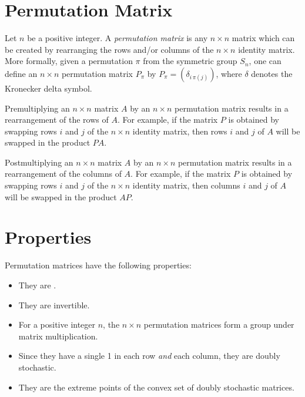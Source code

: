 \documentclass[12pt]{article}
\begin{document}

\section{Permutation Matrix}

Let $n$ be a positive integer.  A \emph{permutation matrix} is any $n\times n$ matrix which can be created by rearranging the rows and/or columns of the $n\times n$ identity matrix.  More formally, given a permutation $\pi$ from the symmetric group $S_n$, one can define an $n\times n$ permutation matrix $P_{\pi}$ by $P_{\pi}=(\delta_{i\, \pi(j)})$, where $\delta$ denotes the Kronecker delta symbol.  

Premultiplying an $n\times n$ matrix $A$ by an $n\times n$ permutation matrix results in a rearrangement of the rows of $A$.  For example, if the matrix $P$ is obtained by swapping rows $i$ and $j$ of the $n \times n$ identity matrix, then rows $i$ and $j$ of $A$ will be swapped in the product $PA$.

Postmultiplying an $n\times n$ matrix $A$ by an $n\times n$ permutation matrix results in a rearrangement of the columns of $A$.  For example, if the matrix $P$ is obtained by swapping rows $i$ and $j$ of the $n \times n$ identity matrix, then columns $i$ and $j$ of $A$ will be swapped in the product $AP$.

\section{Properties}

Permutation matrices have the following properties:

\begin{itemize}
\item They are .
\item They are invertible.
\item For a  positive integer $n$, the $n \times n$ permutation matrices form a group under matrix multiplication.
\item Since they have a single 1 in each row \emph{and} each column, they are doubly stochastic.
\item They are the extreme points of the convex set of doubly stochastic matrices.
\end{itemize}
\end{document}
